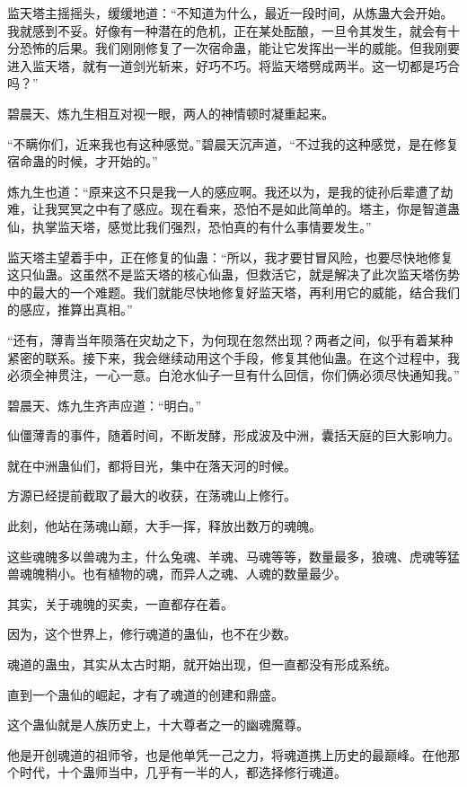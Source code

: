 \begin{this_body}
监天塔主摇摇头，缓缓地道：“不知道为什么，最近一段时间，从炼蛊大会开始。我就感到不妥。好像有一种潜在的危机，正在某处酝酿，一旦令其发生，就会有十分恐怖的后果。我们刚刚修复了一次宿命蛊，能让它发挥出一半的威能。但我刚要进入监天塔，就有一道剑光斩来，好巧不巧。将监天塔劈成两半。这一切都是巧合吗？”

碧晨天、炼九生相互对视一眼，两人的神情顿时凝重起来。

“不瞒你们，近来我也有这种感觉。”碧晨天沉声道，“不过我的这种感觉，是在修复宿命蛊的时候，才开始的。”

炼九生也道：“原来这不只是我一人的感应啊。我还以为，是我的徒孙后辈遭了劫难，让我冥冥之中有了感应。现在看来，恐怕不是如此简单的。塔主，你是智道蛊仙，执掌监天塔，感觉比我们强烈，恐怕真的有什么事情要发生。”

监天塔主望着手中，正在修复的仙蛊：“所以，我才要甘冒风险，也要尽快地修复这只仙蛊。这虽然不是监天塔的核心仙蛊，但救活它，就是解决了此次监天塔伤势中的最大的一个难题。我们就能尽快地修复好监天塔，再利用它的威能，结合我们的感应，推算出真相。”

“还有，薄青当年陨落在灾劫之下，为何现在忽然出现？两者之间，似乎有着某种紧密的联系。接下来，我会继续动用这个手段，修复其他仙蛊。在这个过程中，我必须全神贯注，一心一意。白沧水仙子一旦有什么回信，你们俩必须尽快通知我。”

碧晨天、炼九生齐声应道：“明白。”

仙僵薄青的事件，随着时间，不断发酵，形成波及中洲，囊括天庭的巨大影响力。

就在中洲蛊仙们，都将目光，集中在落天河的时候。

方源已经提前截取了最大的收获，在荡魂山上修行。

此刻，他站在荡魂山巅，大手一挥，释放出数万的魂魄。

这些魂魄多以兽魂为主，什么兔魂、羊魂、马魂等等，数量最多，狼魂、虎魂等猛兽魂魄稍小。也有植物的魂，而异人之魂、人魂的数量最少。

其实，关于魂魄的买卖，一直都存在着。

因为，这个世界上，修行魂道的蛊仙，也不在少数。

魂道的蛊虫，其实从太古时期，就开始出现，但一直都没有形成系统。

直到一个蛊仙的崛起，才有了魂道的创建和鼎盛。

这个蛊仙就是人族历史上，十大尊者之一的幽魂魔尊。

他是开创魂道的祖师爷，也是他单凭一己之力，将魂道携上历史的最巅峰。在他那个时代，十个蛊师当中，几乎有一半的人，都选择修行魂道。


\end{this_body}
